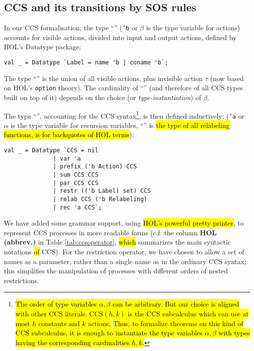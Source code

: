 
\subsection{CCS and its transitions by SOS rules}

In our CCS formalisation, the type ``'' (\texttt{'b} or
$\beta$ is the type variable for actions) accounts for visible actions, divided into input
and output actions, defined by HOL's Datatype package:
\begin{lstlisting}
val _ = Datatype `Label = name 'b | coname 'b`;
\end{lstlisting}
The type ``'' is the
union of all visible actions, plus invisible action $\tau$ (now based on
HOL's \texttt{option} theory). The cardinality of
``'' (and therefore of all
CCS types built on top of it)
 depends on the choice (or \emph{type-instantiation}) of $\beta$.

The type ``'', accounting for the CCS
syntax\footnote{\hl{The order of type variables $\alpha, \beta$ can be
    arbitrary. But our choice is aligned with other CCS literals.
$\mathrm{CCS}(h,k)$ is the CCS subcalculus which can use at most $h$ constants
and $k$ actions.} \cite{gorrieri2017ccs} \hl{Thus, to formalize theorems on
this kind of CCS subcalculus, it is enough to instantiate the type
variables $\alpha, \beta$ with types having the corresponding cardinalities $h, k$.}}, is then defined inductively:
(\texttt{'a} or $\alpha$ is the type variable for recursion variables,
``'' is \hl{the type of all relabeling functions,
\mbox{} is for backquotes of HOL terms}):
\begin{lstlisting}
val _ = Datatype `CCS = nil
		      | var 'a
		      | prefix ('b Action) CCS
		      | sum CCS CCS
		      | par CCS CCS
		      | restr (('b Label) set) CCS
		      | relab CCS ('b Relabeling)
		      | rec 'a CCS`;
\end{lstlisting}

We have added some grammar support,
 using \hl{HOL's powerful pretty printer}, to represent CCS
processes in more readable forms (c.f. the column \textbf{HOL (abbrev.)}
in Table \ref{tab:ccsoperator}, \hl{which} summarizes 
the main syntactic notations \hl{of} CCS). For the restriction
operator, we have chosen to allow a  set of names as a parameter, rather than a
  single name as in the ordinary  CCS syntax; this simplifies 
the manipulation of 
 processes with different orders of
  nested restrictions.

